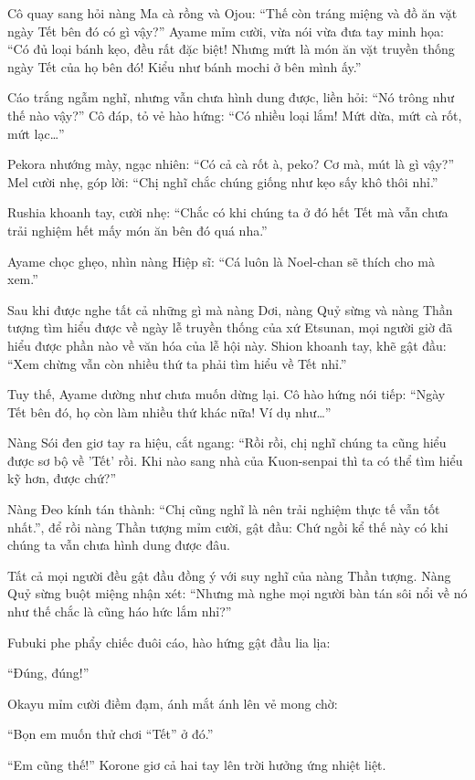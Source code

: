 \documentclass[../main.tex]{subfiles}
\begin{document}
Cô quay sang hỏi nàng Ma cà rồng và Ojou: ``Thế còn tráng miệng và đồ ăn vặt ngày Tết bên đó có gì vậy?'' Ayame mỉm cười, vừa nói vừa đưa tay minh họa: ``Có đủ loại bánh kẹo, đều rất đặc biệt! Nhưng mứt là món ăn vặt truyền thống ngày Tết của họ bên đó! Kiểu như bánh mochi ở bên mình ấy.''

Cáo trắng ngẫm nghĩ, nhưng vẫn chưa hình dung được, liền hỏi: ``Nó trông như thế nào vậy?'' Cô đáp, tỏ vẻ hào hứng: ``Có nhiều loại lắm! Mứt dừa, mứt cà rốt, mứt lạc\dots''

Pekora nhướng mày, ngạc nhiên: ``Có cả cà rốt à, peko? Cơ mà, mút là gì vậy?'' Mel cười nhẹ, góp lời: ``Chị nghĩ chắc chúng giống như kẹo sấy khô thôi nhỉ.''

Rushia khoanh tay, cười nhẹ: ``Chắc có khi chúng ta ở đó hết Tết mà vẫn chưa trải nghiệm hết mấy món ăn bên đó quá nha.''

Ayame chọc ghẹo, nhìn nàng Hiệp sĩ: ``Cá luôn là Noel-chan sẽ thích cho mà xem.''

Sau khi được nghe tất cả những gì mà nàng Dơi, nàng Quỷ sừng và nàng Thần tượng tìm hiểu được về ngày lễ truyền thống của xứ Etsunan, mọi người giờ đã hiểu được phần nào về văn hóa của lễ hội này. Shion khoanh tay, khẽ gật đầu: ``Xem chừng vẫn còn nhiều thứ ta phải tìm hiểu về Tết nhỉ.''

Tuy thế, Ayame dường như chưa muốn dừng lại. Cô hào hứng nói tiếp: ``Ngày Tết bên đó, họ còn làm nhiều thứ khác nữa! Ví dụ như\dots''

Nàng Sói đen giơ tay ra hiệu, cắt ngang: ``Rồi rồi, chị nghĩ chúng ta cũng hiểu được sơ bộ về 'Tết' rồi. Khi nào sang nhà của Kuon-senpai thì ta có thể tìm hiểu kỹ hơn, được chứ?''

Nàng Đeo kính tán thành: ``Chị cũng nghĩ là nên trải nghiệm thực tế vẫn tốt nhất.'', để rồi nàng Thần tượng mỉm cười, gật đầu: Chứ ngồi kể thế này có khi chúng ta vẫn chưa hình dung được đâu.

Tất cả mọi người đều gật đầu đồng ý với suy nghĩ của nàng Thần tượng. Nàng Quỷ sừng buột miệng nhận xét: ``Nhưng mà nghe mọi người bàn tán sôi nổi về nó như thế chắc là cũng háo hức lắm nhỉ?''

Fubuki phe phẩy chiếc đuôi cáo, hào hứng gật đầu lia lịa:

``Đúng, đúng!''

Okayu mỉm cười điềm đạm, ánh mắt ánh lên vẻ mong chờ:

``Bọn em muốn thử chơi ``Tết'' ở đó.''

``Em cũng thế!'' Korone giơ cả hai tay lên trời hưởng ứng nhiệt liệt.
\end{document}

